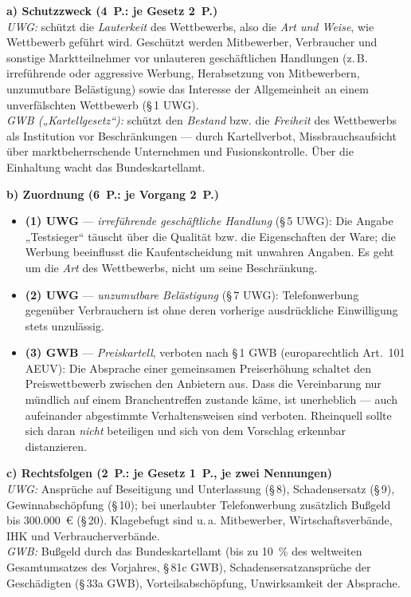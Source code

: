 
\begin{loesung}[title={Lösung Aufgabe~2.1 --- UWG oder GWB?}]
\textbf{a) Schutzzweck (4~P.: je Gesetz 2~P.)}\\
\emph{UWG:} schützt die \emph{Lauterkeit} des Wettbewerbs, also die \emph{Art und Weise},
wie Wettbewerb geführt wird. Geschützt werden Mitbewerber, Verbraucher und sonstige
Marktteilnehmer vor unlauteren geschäftlichen Handlungen (z.\,B. irreführende oder
aggressive Werbung, Herabsetzung von Mitbewerbern, unzumutbare Belästigung) sowie das
Interesse der Allgemeinheit an einem unverfälschten Wettbewerb (\S\,1 UWG).\\
\emph{GWB („Kartellgesetz``):} schützt den \emph{Bestand} bzw. die \emph{Freiheit} des
Wettbewerbs als Institution vor Beschränkungen --- durch Kartellverbot,
Missbrauchsaufsicht über marktbeherrschende Unternehmen und Fusionskontrolle. Über die
Einhaltung wacht das Bundeskartellamt.

\textbf{b) Zuordnung (6~P.: je Vorgang 2~P.)}
\begin{itemize}
  \item \textbf{(1) UWG} --- \emph{irreführende geschäftliche Handlung} (\S\,5 UWG): Die
    Angabe „Testsieger`` täuscht über die Qualität bzw. die Eigenschaften der Ware; die
    Werbung beeinflusst die Kaufentscheidung mit unwahren Angaben. Es geht um die
    \emph{Art} des Wettbewerbs, nicht um seine Beschränkung.
  \item \textbf{(2) UWG} --- \emph{unzumutbare Belästigung} (\S\,7 UWG): Telefonwerbung
    gegenüber Verbrauchern ist ohne deren vorherige ausdrückliche Einwilligung stets
    unzulässig.
  \item \textbf{(3) GWB} --- \emph{Preiskartell}, verboten nach \S\,1 GWB (europarechtlich
    Art.~101 AEUV): Die Absprache einer gemeinsamen Preiserhöhung schaltet den
    Preiswettbewerb zwischen den Anbietern aus. Dass die Vereinbarung nur mündlich auf
    einem Branchentreffen zustande käme, ist unerheblich --- auch aufeinander abgestimmte
    Verhaltensweisen sind verboten. Rheinquell sollte sich daran \emph{nicht} beteiligen
    und sich von dem Vorschlag erkennbar distanzieren.
\end{itemize}

\textbf{c) Rechtsfolgen (2~P.: je Gesetz 1~P., je zwei Nennungen)}\\
\emph{UWG:} Ansprüche auf Beseitigung und Unterlassung (\S\,8), Schadensersatz (\S\,9),
Gewinnabschöpfung (\S\,10); bei unerlaubter Telefonwerbung zusätzlich Bußgeld bis
300.000~€ (\S\,20). Klagebefugt sind u.\,a. Mitbewerber, Wirtschaftsverbände, IHK und
Verbraucherverbände.\\
\emph{GWB:} Bußgeld durch das Bundeskartellamt (bis zu 10~\% des weltweiten
Gesamtumsatzes des Vorjahres, \S\,81c GWB), Schadensersatzansprüche der Geschädigten
(\S\,33a GWB), Vorteilsabschöpfung, Unwirksamkeit der Absprache.
\end{loesung}

